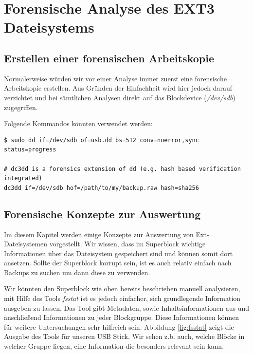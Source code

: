 \newpage

\section{Forensische Analyse des EXT3 Dateisystems}

\subsection{Erstellen einer forensischen Arbeitskopie}

Normalerweise würden wir vor einer Analyse immer zuerst eine forensische Arbeitskopie erstellen. Aus Gründen der Einfachheit wird hier jedoch darauf verzichtet und bei sämtlichen Analysen direkt auf das Blockdevice (\textit{/dev/sdb}) zugegriffen.

Folgende Kommandos könnten verwendet werden:

\begin{lstlisting}
$ sudo dd if=/dev/sdb of=usb.dd bs=512 conv=noerror,sync status=progress

# dc3dd is a forensics extension of dd (e.g. hash based verification integrated)
dc3dd if=/dev/sdb hof=/path/to/my/backup.raw hash=sha256

\end{lstlisting}


\subsection{Forensische Konzepte zur Auswertung}

Im diesem Kapitel werden einige Konzepte zur Auswertung von Ext-Dateisystemen vorgestellt. Wir wissen, dass im Superblock wichtige Informationen über das Dateisystem gespeichert sind und können somit dort ansetzen. Sollte der Superblock korrupt sein, ist es auch relativ einfach nach Backups zu suchen um dann diese zu verwenden.

Wir könnten den Superblock wie oben bereits beschrieben manuell analysieren, mit Hilfe des Tools \textit{fsstat} ist es  jedoch einfacher, sich grundlegende Information ausgeben zu lassen. Das Tool gibt Metadaten, sowie Inhaltsinformationen aus und anschließend Informationen zu jeder Blockgruppe. Diese Informationen können für weitere Untersuchungen sehr hilfreich sein. Abbildung \ref{fig:fsstat} zeigt die Ausgabe des Tools für unseren USB Stick. Wir sehen z.b. auch, welche Blöcke in welcher Gruppe liegen, eine Information die besonders relevant sein kann.

